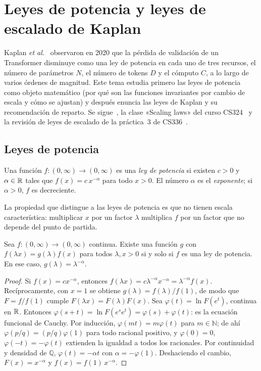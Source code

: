 \chapter{Leyes de potencia y leyes de escalado de Kaplan}
\label{tema:3}

Kaplan \emph{et al.}~\cite{kaplan} observaron en 2020 que la pérdida de validación de un Transformer disminuye como una ley de potencia en cada uno de tres recursos, el número de parámetros $N$, el número de tokens $D$ y el cómputo $C$, a lo largo de varios órdenes de magnitud. Este tema estudia primero las leyes de potencia como objeto matemático (por qué son las funciones invariantes por cambio de escala y cómo se ajustan) y después enuncia las leyes de Kaplan y su recomendación de reparto. Se sigue~\cite[§1.2, §4 y §6]{kaplan}, la clase «Scaling laws» del curso CS324~\cite{cs324} y la revisión de leyes de escalado de la práctica~3 de CS336~\cite[§2]{cs336a3}.

\section{Leyes de potencia}

\begin{definicion}
Una función $f\colon(0,\infty)\to(0,\infty)$ es una \emph{ley de potencia} si existen $c>0$ y $\alpha\in\mathbb{R}$ tales que $f(x)=c\,x^{-\alpha}$ para todo $x>0$. El número $\alpha$ es el \emph{exponente}; si $\alpha>0$, $f$ es decreciente.
\end{definicion}

La propiedad que distingue a las leyes de potencia es que no tienen escala característica: multiplicar $x$ por un factor $\lambda$ multiplica $f$ por un factor que no depende del punto de partida.

\begin{proposicion}\label{prop:escala}
Sea $f\colon(0,\infty)\to(0,\infty)$ continua. Existe una función $g$ con $f(\lambda x)=g(\lambda)f(x)$ para todos $\lambda,x>0$ si y solo si $f$ es una ley de potencia. En ese caso, $g(\lambda)=\lambda^{-\alpha}$.
\end{proposicion}

\begin{proof}
Si $f(x)=cx^{-\alpha}$, entonces $f(\lambda x)=c\lambda^{-\alpha}x^{-\alpha}=\lambda^{-\alpha}f(x)$. Recíprocamente, con $x=1$ se obtiene $g(\lambda)=f(\lambda)/f(1)$, de modo que $F=f/f(1)$ cumple $F(\lambda x)=F(\lambda)F(x)$. Sea $\varphi(t)=\ln F(e^{t})$, continua en $\mathbb{R}$. Entonces $\varphi(s+t)=\ln F(e^{s}e^{t})=\varphi(s)+\varphi(t)$: es la ecuación funcional de Cauchy. Por inducción, $\varphi(mt)=m\varphi(t)$ para $m\in\mathbb{N}$; de ahí $\varphi(p/q)=(p/q)\varphi(1)$ para todo racional positivo, y $\varphi(0)=0$, $\varphi(-t)=-\varphi(t)$ extienden la igualdad a todos los racionales. Por continuidad y densidad de $\mathbb{Q}$, $\varphi(t)=-\alpha t$ con $\alpha=-\varphi(1)$. Deshaciendo el cambio, $F(x)=x^{-\alpha}$ y $f(x)=f(1)\,x^{-\alpha}$.
\end{proof}

